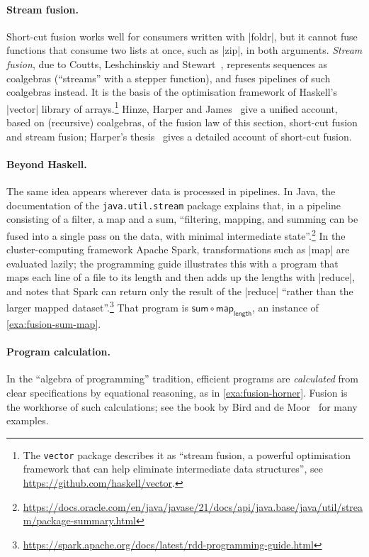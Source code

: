 \documentclass[a4paper,11pt, oneside,titlepage=false]{scrbook}
\theoremstyle{plain}
\theoremstyle{definition}
\begin{document}
\paragraph{Stream fusion.}
Short-cut fusion works well for consumers written with |foldr|, but it cannot fuse functions that consume two lists at once, such as |zip|, in both arguments.
\emph{Stream fusion}, due to Coutts, Leshchinskiy and Stewart~\cite{coutts-leshchinskiy-stewart-2007}, represents sequences as coalgebras (``streams'' with a stepper function), and fuses pipelines of such coalgebras instead.
It is the basis of the optimisation framework of Haskell's |vector| library of arrays.\footnote{The \texttt{vector} package describes it as ``stream fusion, a powerful optimisation framework that can help eliminate intermediate data structures'', see \url{https://github.com/haskell/vector}.}
Hinze, Harper and James~\cite{hinze-harper-james-2010} give a unified account, based on (recursive) coalgebras, of the fusion law of this section, short-cut fusion and stream fusion; Harper's thesis~\cite{DBLP:phd/ethos/Harper13} gives a detailed account of short-cut fusion.

\paragraph{Beyond Haskell.}
The same idea appears wherever data is processed in pipelines.
In Java, the documentation of the \texttt{java.util.stream} package explains that, in a pipeline consisting of a filter, a map and a sum, ``filtering, mapping, and summing can be fused into a single pass on the data, with minimal intermediate state''.\footnote{\url{https://docs.oracle.com/en/java/javase/21/docs/api/java.base/java/util/stream/package-summary.html}}
In the cluster-computing framework Apache Spark, transformations such as |map| are evaluated lazily; the programming guide illustrates this with a program that maps each line of a file to its length and then adds up the lengths with |reduce|, and notes that Spark can return only the result of the |reduce| ``rather than the larger mapped dataset''.\footnote{\url{https://spark.apache.org/docs/latest/rdd-programming-guide.html}}
That program is $\mathsf{sum} \circ \mathsf{map}_{\mathsf{length}}$, an instance of \cref{exa:fusion-sum-map}.

\paragraph{Program calculation.}
In the ``algebra of programming'' tradition, efficient programs are \emph{calculated} from clear specifications by equational reasoning, as in \cref{exa:fusion-horner}.
Fusion is the workhorse of such calculations; see the book by Bird and de Moor~\cite{bird-demoor-1997} for many examples.
\end{document}

